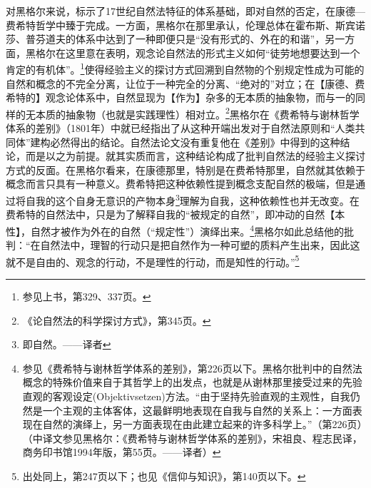 对黑格尔来说，标示了17世纪自然法特征的体系基础，即对自然的否定，在康德—费希特哲学中臻于完成。一方面，黑格尔在那里承认，伦理总体在霍布斯、斯宾诺莎、普芬道夫的体系中达到了一种即便只是“没有形式的、外在的和谐”，另一方面，黑格尔在这里意在表明，观念论自然法的形式主义如何“徒劳地想要达到一个肯定的有机体”。\footnote{参见上书，第329、337页。}使得经验主义的探讨方式回溯到自然物的个别规定性成为可能的自然和概念的不完全分离，让位于一种完全的分离、“绝对的”对立；在【康德、费希特的】观念论体系中，自然显现为【作为】杂多的无本质的抽象物，而与一的同样的无本质的抽象物（也就是实践理性）相对立。\footnote{《论自然法的科学探讨方式》，第345页。}黑格尔在《费希特与谢林哲学体系的差别》（1801年）中就已经指出了从这种开端出发对于自然法原则和“人类共同体”建构必然得出的结论。自然法论文没有重复他在《差别》中得到的这种结论，而是以之为前提。就其实质而言，这种结论构成了批判自然法的经验主义探讨方式的反面。在黑格尔看来，在康德那里，特别是在费希特那里，自然就其依赖于概念而言只具有一种意义。费希特把这种依赖性提到概念支配自然的极端，但是通过将自我的这个自身无意识的产物本身\footnote{即自然。——译者}理解为自我，这种依赖性也并无改变。在费希特的自然法中，只是为了解释自我的“被规定的自然”，即冲动的自然【本性】，自然才被作为外在的自然（“规定性”）演绎出来。\footnote{参见《费希特与谢林哲学体系的差别》，第226页以下。黑格尔批判中的自然法概念的特殊价值来自于其哲学上的出发点，也就是从谢林那里接受过来的先验直观的客观设定(Objektivsetzen)方法。“由于坚持先验直观的主观性，自我仍然是一个主观的主体客体，这最鲜明地表现在自我与自然的关系上：一方面表现在自然的演绎上，另一方面表现在由此建立起来的许多科学上。”（第226页）（中译文参见黑格尔：《费希特与谢林哲学体系的差别》，宋祖良、程志民译，商务印书馆1994年版，第55页。——译者）}黑格尔如此总结他的批判：“在自然法中，理智的行动只是把自然作为一种可塑的质料产生出来，因此这就不是自由的、观念的行动，不是理性的行动，而是知性的行动。”\footnote{出处同上，第247页以下；也见《信仰与知识》，第140页以下。}

